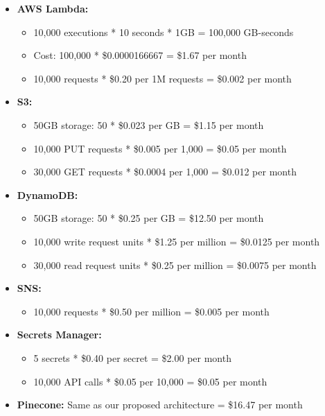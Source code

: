 \documentclass[a4paper, 12pt]{report}
\begin{document}
\begin{itemize}
    \item \textbf{AWS Lambda:} 
        \begin{itemize}
            \item 10,000 executions * 10 seconds * 1GB = 100,000 GB-seconds
            \item Cost: 100,000 * \$0.0000166667 = \$1.67 per month
            \item 10,000 requests * \$0.20 per 1M requests = \$0.002 per month
        \end{itemize}
    \item \textbf{S3:} 
        \begin{itemize}
            \item 50GB storage: 50 * \$0.023 per GB = \$1.15 per month
            \item 10,000 PUT requests * \$0.005 per 1,000 = \$0.05 per month
            \item 30,000 GET requests * \$0.0004 per 1,000 = \$0.012 per month
        \end{itemize}
    \item \textbf{DynamoDB:} 
        \begin{itemize}
            \item 50GB storage: 50 * \$0.25 per GB = \$12.50 per month
            \item 10,000 write request units * \$1.25 per million = \$0.0125 per month
            \item 30,000 read request units * \$0.25 per million = \$0.0075 per month
        \end{itemize}
    \item \textbf{SNS:} 
        \begin{itemize}
            \item 10,000 requests * \$0.50 per million = \$0.005 per month
        \end{itemize}
    \item \textbf{Secrets Manager:} 
        \begin{itemize}
            \item 5 secrets * \$0.40 per secret = \$2.00 per month
            \item 10,000 API calls * \$0.05 per 10,000 = \$0.05 per month
        \end{itemize}
    \item \textbf{Pinecone:} Same as our proposed architecture = \$16.47 per month
\end{itemize}
\end{document}

